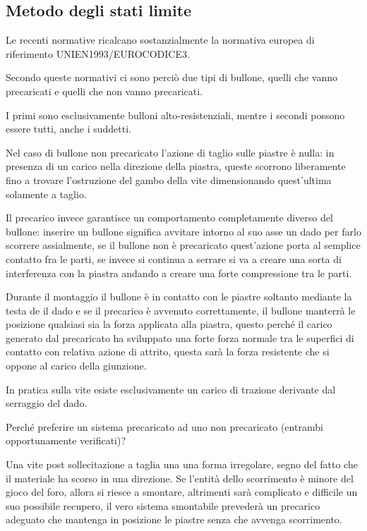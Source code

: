 \documentclass[a4paper, 15pt]{article}
\begin{document}
\subsection{Metodo degli stati limite}
\begin{adjustwidth}{2in}{}	
	Le recenti normative ricalcano sostanzialmente la normativa europea di riferimento UNIEN1993/EUROCODICE3. 
	
	Secondo queste normativi ci sono perciò due tipi di bullone, quelli che vanno precaricati e quelli che non vanno precaricati. \newline 
	
	I primi sono esclusivamente bulloni alto-resistenziali, mentre i secondi possono essere tutti, anche i suddetti. 
	
	Nel caso di bullone non precaricato l'azione di taglio sulle piastre è nulla:  in presenza di un carico nella direzione della piastra, queste scorrono liberamente fino a trovare l'ostruzione del gambo della vite dimensionando quest'ultima solamente a taglio. 
	
	Il precarico invece garantisce un comportamento completamente diverso del bullone: inserire un bullone significa avvitare intorno al suo asse un dado per farlo scorrere assialmente, se il bullone non è precaricato quest'azione porta al semplice contatto fra le parti, se invece si continua a serrare si va a creare una sorta di interferenza con la piastra andando a creare una forte compressione tra le parti. 
	 
	 Durante il montaggio il bullone è in contatto con le piastre soltanto mediante la testa de il dado e se il precarico è avvenuto correttamente, il bullone manterrà le posizione qualsiasi sia la forza applicata alla piastra, questo perché il carico generato dal precaricato ha sviluppato una forte forza normale tra le superfici di contatto con relativa azione di attrito, questa sarà la forza resistente che si oppone al carico della giunzione. \newline 
	 
	 In pratica sulla vite esiste esclusivamente un carico di trazione derivante dal serraggio del dado. \newline 
	 
	 Perché preferire un sistema precaricato ad uno non precaricato (entrambi opportunamente verificati)? 
	 
	 Una vite post sollecitazione a taglia una una forma irregolare, segno del fatto che il materiale ha scorso in una direzione. Se l'entità dello scorrimento è minore del gioco del foro, allora si riesce a smontare, altrimenti sarà complicato e difficile un suo possibile recupero, il vero sistema smontabile prevederà un precarico adeguato che mantenga in posizione le piastre senza che avvenga scorrimento. \newline 
	 

\end{adjustwidth}
\end{document}
